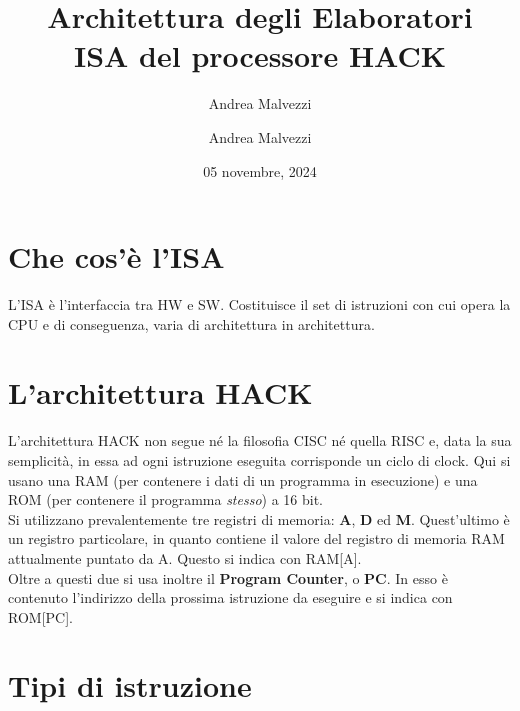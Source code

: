 \documentclass[12pt]{article}
\author{Andrea Malvezzi}
\title{\textbf{Architettura degli Elaboratori\\ ISA del processore HACK}}
\date{05 novembre, 2024}
\author{Andrea Malvezzi}
\begin{document}
\maketitle
\pagebreak
\tableofcontents
\pagebreak

\section{Che cos'è l'ISA}
L'ISA è l'interfaccia tra HW e SW.
Costituisce il set di istruzioni con cui opera la CPU e di conseguenza, varia di architettura in architettura.

\section{L'architettura HACK}
L'architettura HACK non segue né la filosofia CISC né quella RISC e, data la sua semplicità, in essa ad ogni istruzione eseguita corrisponde un ciclo di clock.
Qui si usano una RAM (per contenere i dati di un programma in esecuzione) e una ROM (per contenere il programma \textit{stesso}) a 16 bit. \\
Si utilizzano prevalentemente tre registri di memoria: \textbf{A}, \textbf{D} ed \textbf{M}.
Quest'ultimo è un registro particolare, in quanto contiene il valore del registro di memoria RAM attualmente puntato da A. Questo si indica con RAM[A]. \\
Oltre a questi due si usa inoltre il \textbf{Program Counter}, o \textbf{PC}. In esso è contenuto l'indirizzo della prossima istruzione da eseguire e si indica con ROM[PC].

\section{Tipi di istruzione}
\end{document}
